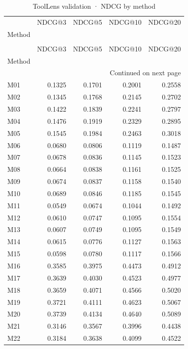 \begin{longtable}{lrrrr}
\caption{ToolLens validation · NDCG by method} \label{tab:ToolLens-validation-validation-family-ndcg} \\
\toprule
 & NDCG@3 & NDCG@5 & NDCG@10 & NDCG@20 \\
Method &  &  &  &  \\
\midrule
\endfirsthead
\caption[]{ToolLens validation · NDCG by method} \\
\toprule
 & NDCG@3 & NDCG@5 & NDCG@10 & NDCG@20 \\
Method &  &  &  &  \\
\midrule
\endhead
\midrule
\multicolumn{5}{r}{Continued on next page} \\
\midrule
\endfoot
\bottomrule
\endlastfoot
M01 & 0.1325 & 0.1701 & 0.2001 & 0.2558 \\
M02 & 0.1345 & 0.1768 & 0.2145 & 0.2702 \\
M03 & 0.1422 & 0.1839 & 0.2241 & 0.2797 \\
M04 & 0.1476 & 0.1919 & 0.2329 & 0.2895 \\
M05 & 0.1545 & 0.1984 & 0.2463 & 0.3018 \\
M06 & 0.0680 & 0.0806 & 0.1119 & 0.1487 \\
M07 & 0.0678 & 0.0836 & 0.1145 & 0.1523 \\
M08 & 0.0664 & 0.0838 & 0.1161 & 0.1525 \\
M09 & 0.0674 & 0.0837 & 0.1158 & 0.1540 \\
M10 & 0.0689 & 0.0846 & 0.1185 & 0.1545 \\
M11 & 0.0549 & 0.0674 & 0.1044 & 0.1492 \\
M12 & 0.0610 & 0.0747 & 0.1095 & 0.1554 \\
M13 & 0.0607 & 0.0749 & 0.1095 & 0.1549 \\
M14 & 0.0615 & 0.0776 & 0.1127 & 0.1563 \\
M15 & 0.0598 & 0.0780 & 0.1117 & 0.1566 \\
M16 & 0.3585 & 0.3975 & 0.4473 & 0.4912 \\
M17 & 0.3639 & 0.4030 & 0.4523 & 0.4977 \\
M18 & 0.3659 & 0.4071 & 0.4566 & 0.5020 \\
M19 & 0.3721 & 0.4111 & 0.4623 & 0.5067 \\
M20 & 0.3739 & 0.4134 & 0.4640 & 0.5089 \\
M21 & 0.3146 & 0.3567 & 0.3996 & 0.4438 \\
M22 & 0.3184 & 0.3638 & 0.4099 & 0.4522 \\

\end{longtable}
